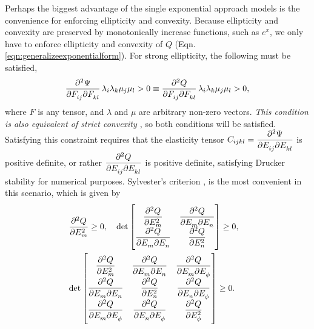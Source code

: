 	Perhaps the biggest advantage of the single exponential approach models is the convenience for enforcing ellipticity and convexity. Because ellipticity and convexity are preserved by monotonically increase functions, such as $e^x$, we only have to enforce ellipticity and convexity of $Q$ (Eqn. \ref{eqn:generalizeexponentialform}). For strong ellipticity, the following must be satisfied,
\begin{equation}\label{eqn:strongellipticity}
\dmd{\Psi}{2}{F_{ij}}{}{F_{kl}}{}\lambda_i\lambda_k\mu_j\mu_l > 0 \equiv \dmd{Q}{2}{F_{ij}}{}{F_{kl}}{}\lambda_i\lambda_k\mu_j\mu_l > 0,
\end{equation}
	where $F$ is any tensor, and $\lambda$ and $\mu$ are arbitrary non-zero vectors. \emph{This condition is also equivalent of strict convexity \cite{ball_strict_1980}}, so both conditions will be satisfied. Satisfying this constraint requires that the elasticity tensor $C_{ijkl}=\dmd{\Psi}{2}{E_{ij}}{}{E_{kl}}{}$ is positive definite, or rather $\dmd{Q}{2}{E_{ij}}{}{E_{kl}}{}$ is positive definite, satisfying Drucker stability for numerical purposes. Sylvester's criterion \cite{gilbert_positive_1991}, is the most convenient in this scenario, which is given by 
\begin{equation}\label{eqn:convexitycriteria}
\begin{aligned}
&\dpd[2]{Q}{E_m} \geq 0, \quad
\det
\begin{bmatrix}
\dpd[2]{Q}{E_m} & \dmd{Q}{2}{E_m}{}{E_n}{}\\
\dmd{Q}{2}{E_m}{}{E_n}{} & \dpd[2]{Q}{E_n}\\
\end{bmatrix} \geq0, \quad  \\
&\det
\begin{bmatrix}
\dpd[2]{Q}{E_m} & \dmd{Q}{2}{E_m}{}{E_n}{} & \dmd{Q}{2}{E_m}{}{E_\phi}{}\\
\dmd{Q}{2}{E_m}{}{E_n}{} & \dpd[2]{Q}{E_n} & \dmd{Q}{2}{E_n}{}{E_\phi}{}\\
\dmd{Q}{2}{E_m}{}{E_\phi}{} & \dmd{Q}{2}{E_n}{}{E_\phi}{} & \dpd[2]{Q}{E_\phi} \\
\end{bmatrix} \geq0.
\end{aligned}
\end{equation}
